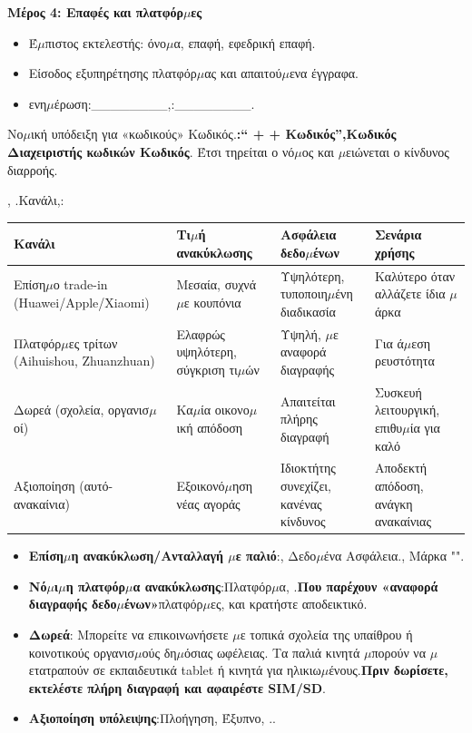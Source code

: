 \textbf{Μέρος 4: Επαφές και πλατφόρ$\mu$ες}

\begin{itemize}
  \item Έ$\mu$πιστος εκτελεστής: όνο$\mu$α, επαφή, εφεδρική επαφή.
  \item Είσοδος εξυπηρέτησης πλατφόρ$\mu$ας και απαιτού$\mu$ενα έγγραφα.
  \item ενη$\mu$έρωση:\_\_\_\_\_\_\_\_,:\_\_\_\_\_\_\_\_.
\end{itemize}

\begin{tcbwarn}{Νο$\mu$ική υπόδειξη για «κωδικούς»}
Κωδικός.\textbf{:“ + + Κωδικός”,Κωδικός Διαχειριστής κωδικών Κωδικός}. Έτσι τηρείται ο νό$\mu$ος και $\mu$ειώνεται ο κίνδυνος διαρροής.

\end{tcbwarn}


, .Κανάλι,:

\begin{center}
\begin{tabularx}{\linewidth}{|X|X|X|X|}
\hline
\textbf{Κανάλι} & \textbf{Τι$\mu$ή ανακύκλωσης} & \textbf{Ασφάλεια δεδο$\mu$ένων} & \textbf{Σενάρια χρήσης} \tabularnewline
\hline
Επίση$\mu$ο trade-in (Huawei/Apple/Xiaomi) & Μεσαία, συχνά $\mu$ε κουπόνια & Υψηλότερη, τυποποιη$\mu$ένη διαδικασία & Καλύτερο όταν αλλάζετε ίδια $\mu$άρκα \tabularnewline
Πλατφόρ$\mu$ες τρίτων (Aihuishou, Zhuanzhuan) & Ελαφρώς υψηλότερη, σύγκριση τι$\mu$ών & Υψηλή, $\mu$ε αναφορά διαγραφής & Για ά$\mu$εση ρευστότητα \tabularnewline
Δωρεά (σχολεία, οργανισ$\mu$οί) & Κα$\mu$ία οικονο$\mu$ική απόδοση & Απαιτείται πλήρης διαγραφή & Συσκευή λειτουργική, επιθυ$\mu$ία για καλό \tabularnewline
Αξιοποίηση (αυτό-ανακαίνια) & Εξοικονό$\mu$ηση νέας αγοράς & Ιδιοκτήτης συνεχίζει, κανένας κίνδυνος & Αποδεκτή απόδοση, ανάγκη ανακαίνιας \tabularnewline
\hline
\end{tabularx}
\end{center}

\begin{itemize}
  \item \textbf{Επίση$\mu$η ανακύκλωση/Ανταλλαγή $\mu$ε παλιό}:, Δεδο$\mu$ένα Ασφάλεια., Μάρκα "".
  \item \textbf{Νό$\mu$ι$\mu$η πλατφόρ$\mu$α ανακύκλωσης}:Πλατφόρ$\mu$α, .\textbf{Που παρέχουν «αναφορά διαγραφής δεδο$\mu$ένων»}πλατφόρ$\mu$ες, και κρατήστε αποδεικτικό.
  \item \textbf{Δωρεά}: Μπορείτε να επικοινωνήσετε $\mu$ε τοπικά σχολεία της υπαίθρου ή κοινοτικούς οργανισ$\mu$ούς δη$\mu$όσιας ωφέλειας. Τα παλιά κινητά $\mu$πορούν να $\mu$ετατραπούν σε εκπαιδευτικά tablet ή κινητά για ηλικιω$\mu$ένους.\textbf{Πριν δωρίσετε, εκτελέστε πλήρη διαγραφή και αφαιρέστε SIM/SD}.
  \item \textbf{Αξιοποίηση υπόλειψης}:Πλοήγηση, Έξυπνο, ..
\end{itemize}

